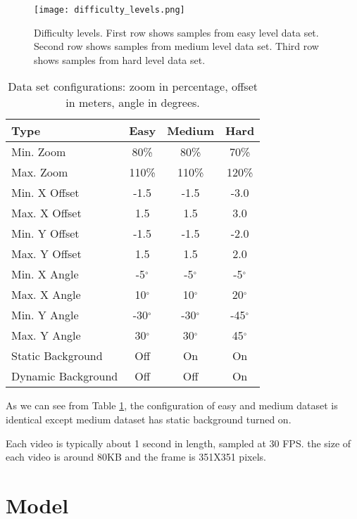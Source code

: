 \documentclass[
	a4paper, %
	10pt, %
	unnumberedsections, %
	twoside, %
]{t0004}
\begin{document}
\begin{figure}
	\texttt{[image: difficulty\_levels.png]}
	\caption{Difficulty levels. First row shows samples from easy level data set. Second row shows samples from medium level data set. Third row shows samples from hard level data set.}
	\label{fig:difficultylevels}
\end{figure}

\begin{table} %
	\caption{Data set configurations: zoom in percentage, offset in meters, angle in degrees.}
	\centering
	\begin{tabular}{lccc}
		\toprule
		Type & Easy & Medium & Hard  \\
		\midrule
		Min. Zoom & 80\% & 80\% & 70\% \\
		Max. Zoom & 110\% &  110\% & 120\%  \\
		\hline
		Min. X Offset & -1.5 & -1.5 & -3.0 \\
		Max. X Offset &  1.5 & 1.5 & 3.0 \\
		\hline
		Min. Y Offset & -1.5 & -1.5 & -2.0 \\
		Max. Y Offset &  1.5 & 1.5 & 2.0 \\
		\hline
		Min. X Angle & -5$^{\circ}$ & -5$^{\circ}$ & -5$^{\circ}$ \\
		Max. X Angle & 10$^{\circ}$ & 10$^{\circ}$ & 20$^{\circ}$ \\
		\hline
		Min. Y Angle & -30$^{\circ}$ & -30$^{\circ}$ & -45$^{\circ}$ \\
		Max. Y Angle & 30$^{\circ}$ & 30$^{\circ}$ & 45$^{\circ}$ \\
		\hline
		Static Background & Off & On & On \\
		Dynamic Background & Off & Off & On \\
		\bottomrule
	\end{tabular}
	\label{tab:dataconfig}
\end{table}

As we can see from Table \ref{tab:dataconfig}, the configuration of easy and medium dataset is identical except medium dataset has static background turned on.

Each video is typically about 1 second in length, sampled at 30 FPS. the size of each video is around 80KB and the frame is 351X351 pixels.

\section{Model}
\end{document}
